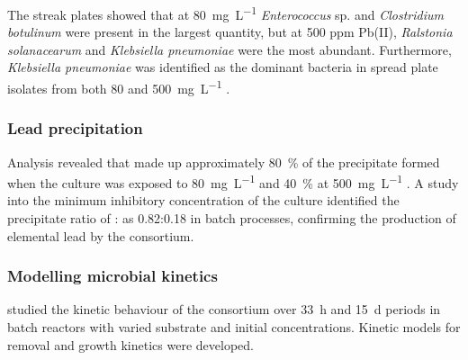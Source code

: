 The streak plates showed that at \SI{80}{\milli\gram\per\liter}  \textit{Enterococcus} sp. and \textit{Clostridium botulinum} were present in the largest quantity, but at 500 ppm Pb(II), \textit{Ralstonia solanacearum} and \textit{Klebsiella pneumoniae} were the most abundant. Furthermore, \textit{Klebsiella pneumoniae} was identified as the dominant bacteria in spread plate isolates from both 80 and \SI{500}{\milli\gram\per\liter} \parencite{Peens2018}.

\subsubsection{Lead precipitation}

Analysis revealed that  made up approximately \SI{80}{\percent} of the precipitate formed when the culture was exposed to \SI{80}{\milli\gram\per\liter}  and \SI{40}{\percent} at \SI{500}{\milli\gram\per\liter} \parencite{Peens2018}. A study into the minimum inhibitory  concentration of the culture identified the precipitate ratio of : as 0.82:0.18 in batch processes, confirming the production of elemental lead by the consortium.


  

\subsubsection{Modelling microbial kinetics}

\textcite{Horstman2019} studied the kinetic behaviour of the consortium over \SI{33}{\hour} and \SI{15}{\day} periods in batch reactors with varied substrate and  initial concentrations. Kinetic models for  removal and growth kinetics were developed.

